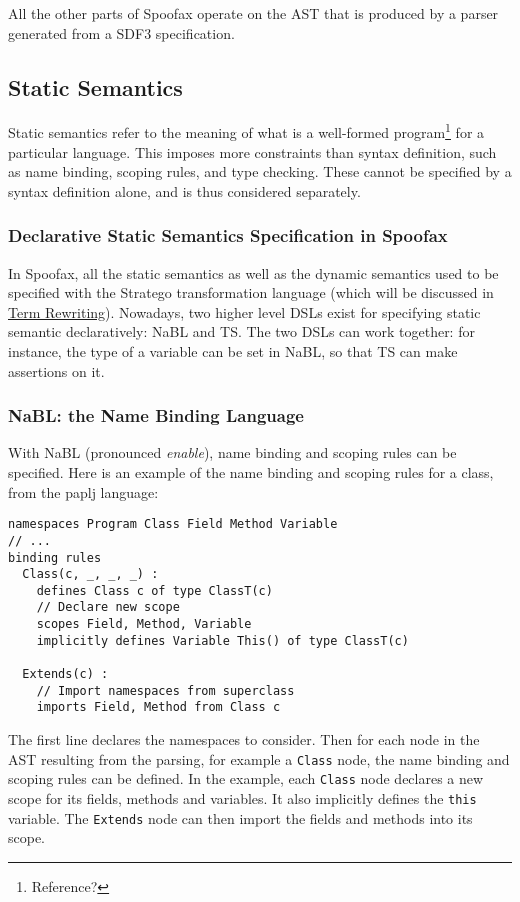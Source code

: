 All the other parts of Spoofax operate on the AST that is produced by
a parser generated from a SDF3 specification.
\subsection{Static Semantics}
\label{sec-static-analysis}
Static semantics refer to the meaning of what is a well-formed
program\footnote{Reference?} for a particular language. This
imposes more constraints than syntax definition, such as name binding,
scoping rules, and type checking. These cannot be specified by a
syntax definition alone, and is thus considered separately.
\subsubsection{Declarative Static Semantics Specification in Spoofax}
\label{sec:orgheadline1}
In Spoofax, all the static semantics as well as the dynamic semantics
used to be specified with the Stratego transformation language (which
will be discussed in \hyperref[sec-term-rewrite]{Term Rewriting}). Nowadays, two higher level DSLs
exist for specifying static semantic declaratively: NaBL and TS. The
two DSLs can work together: for instance, the type of a variable can
be set in NaBL, so that TS can make assertions on it.
\subsubsection{NaBL: the Name Binding Language}
\label{sec:orgheadline2}
With NaBL (pronounced \emph{enable}), name binding and scoping rules can be
specified. Here is an example of the name binding and scoping rules
for a class, from the paplj language:
\begin{verbatim}
namespaces Program Class Field Method Variable
// ...
binding rules
  Class(c, _, _, _) :
    defines Class c of type ClassT(c)
    // Declare new scope
    scopes Field, Method, Variable
    implicitly defines Variable This() of type ClassT(c)

  Extends(c) :
    // Import namespaces from superclass
    imports Field, Method from Class c
\end{verbatim}
The first line declares the namespaces to
consider. Then for each node in the AST resulting from the parsing,
for example a \texttt{Class} node, the name binding and scoping rules can be
defined. In the example, each \texttt{Class} node declares a new scope for
its fields, methods and variables. It also implicitly defines the
\texttt{this} variable. The \texttt{Extends} node can then import the fields and
methods into its scope.

